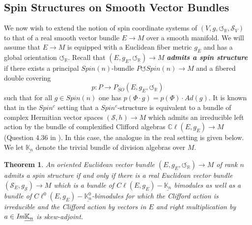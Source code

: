 \documentclass[openany, 11pt]{article}
\newtheorem{theorem}{Theorem}[section]
\theoremstyle{definition}
\theoremstyle{remark}
\def\Sc{\ensuremath{\mathscr{S}}}
\def\cal{\ensuremath{\boldsymbol{\circlearrowleft}}}
\def\bC{\ensuremath{\mathbb{C}}}
\def\bR{\ensuremath{\mathbb{R}}}
\def\bK{\ensuremath{\mathbb{K}}}
\begin{document}
\subsection{Spin Structures on Smooth Vector Bundles}
We now wish to extend the notion of spin coordinate systems of $(V,g,\cal_{\bR},\Sc_V)$ to that of a real smooth vector bundle $E\rightarrow M$ over a smooth manifold. We will assume that $E\rightarrow M$ is equipped with a Euclidean fiber metric $g_E$ and has a global orientation $\cal_{\bR}$. Recall that $(E,g_E,\cal_{\bR})\rightarrow M$  \textbf{\emph{admits a spin structure}} if there exists a principal $Spin(n)$-bundle $P\circlearrowleft Spin(n)\rightarrow M$ and a fibered double covering
\[
    p:P\rightarrow P_{SO}(E,g_E,\cal_{\bR})
\]
such that for all $g\in Spin(n)$ one has $p(\Phi\cdot g)=p(\Phi)\cdot Ad(g)$. It is known that in the $Spin^c$ setting that a $Spin^c$-structure is equivalent to a bundle of complex Hermitian vector spaces $(\Sc,h)\rightarrow M$ which admits an irreducible left action by the bundle of complexified Clifford algebras $\bC\ell(E,g_E)\rightarrow M$ (Question 4.36 in \cite{Roe}). In this case, the analogue in the real setting is given below. We let $\underline{\bK_n}$ denote the trivial bundle of division algebras over $M$.
\begin{theorem}
    An oriented Euclidean vector bundle $(E,g_E,\cal_{\bR})\rightarrow M$ of rank $n$ admits a spin structure if and only if there is a real Euclidean vector bundle $(\Sc_E,g_{\Sc})\rightarrow M$ which is a bundle of $C\ell(E,g_E)-\underline{\bK_n}$ bimodules as well as a bundle of $C\ell^0(E,g_E)-\underline{\bK^0_n}$-bimodules for which the Clifford action is irreducible and the Clifford action by vectors in $E$ and right multiplication by $a\in\emph{Im}\underline{\bK_n}$ is skew-adjoint.
\end{theorem}
\end{document}
